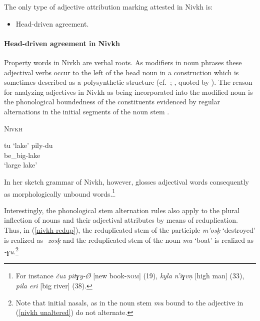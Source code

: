 The only type of adjective attribution marking attested in Nivkh is:
\begin{itemize}
\item Head-driven agreement.
\end{itemize}

\paragraph{Head-driven agreement in Nivkh}
\noindent Property words in Nivkh are verbal roots. As modifiers in noun phrases these adjectival verbs occur to the left of the head noun in a construction which is sometimes described as a polysynthetic structure (cf.~\citealt[16]{gruzdeva1998}; \citealt[80]{jakobson1971}, quoted by \citealt[138]{rijkhoff2002}). The reason for analyzing adjectives in Nivkh as being incorporated into the modified noun is the phonological boundedness of the constituents evidenced by regular alternations in the initial segments of the noun stem \cite[16]{gruzdeva1998}.
\begin{exe}
\ex \textsc{Nivkh} \citep[16]{gruzdeva1998}
\begin{xlist}
\ex tu ‘lake’
\ex 
\gll	pily-du\\
	be\_big-lake\\
\glt	‘large lake’
\end{xlist}
\end{exe}
In her sketch grammar of Nivkh, however, \cite{gruzdeva1998} glosses adjectival words consequently as morphologically unbound words.\footnote{For instance \textit{čuz pitɣy-Ø} [new book-\textsc{nom}] (19), \textit{kyla n'iɣvn̦} [high man] (33), \textit{pila eri} [big river] (38).}

Interestingly, the phonological stem alternation rules also apply to the plural inflection of nouns and their adjectival attributes by means of reduplication. Thus, in (\ref{nivkh redup}), the reduplicated stem of the participle \textit{m'osk̦} ‘destroyed’ is realized as \textit{-zosk̦} and the reduplicated stem of the noun \textit{mu} ‘boat’ is realized as \textit{-ɣu}.\footnote{Note that initial nasals, as in the noun stem \textit{mu} bound to the adjective in (\ref{nivkh unaltered}) do not alternate.}

